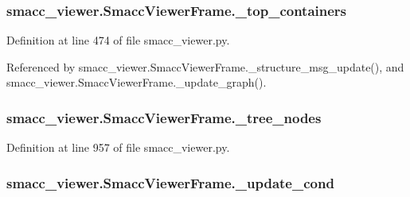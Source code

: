 \subsubsection[{\texorpdfstring{\+\_\+top\+\_\+containers}{_top_containers}}]{\setlength{\rightskip}{0pt plus 5cm}smacc\+\_\+viewer.\+Smacc\+Viewer\+Frame.\+\_\+top\+\_\+containers\hspace{0.3cm}{\ttfamily [private]}}\hypertarget{classsmacc__viewer_1_1SmaccViewerFrame_acc2f4310b3de2703026548d0d18387ea}{}\label{classsmacc__viewer_1_1SmaccViewerFrame_acc2f4310b3de2703026548d0d18387ea}


Definition at line 474 of file smacc\+\_\+viewer.\+py.



Referenced by smacc\+\_\+viewer.\+Smacc\+Viewer\+Frame.\+\_\+structure\+\_\+msg\+\_\+update(), and smacc\+\_\+viewer.\+Smacc\+Viewer\+Frame.\+\_\+update\+\_\+graph().

\subsubsection[{\texorpdfstring{\+\_\+tree\+\_\+nodes}{_tree_nodes}}]{\setlength{\rightskip}{0pt plus 5cm}smacc\+\_\+viewer.\+Smacc\+Viewer\+Frame.\+\_\+tree\+\_\+nodes\hspace{0.3cm}{\ttfamily [private]}}\hypertarget{classsmacc__viewer_1_1SmaccViewerFrame_a50ab0a27c6fec78203a98b6aca6ef1e1}{}\label{classsmacc__viewer_1_1SmaccViewerFrame_a50ab0a27c6fec78203a98b6aca6ef1e1}


Definition at line 957 of file smacc\+\_\+viewer.\+py.

\subsubsection[{\texorpdfstring{\+\_\+update\+\_\+cond}{_update_cond}}]{\setlength{\rightskip}{0pt plus 5cm}smacc\+\_\+viewer.\+Smacc\+Viewer\+Frame.\+\_\+update\+\_\+cond\hspace{0.3cm}{\ttfamily [private]}}\hypertarget{classsmacc__viewer_1_1SmaccViewerFrame_a87c1757aa21438ca8692b2f079b8f393}{}\label{classsmacc__viewer_1_1SmaccViewerFrame_a87c1757aa21438ca8692b2f079b8f393}


